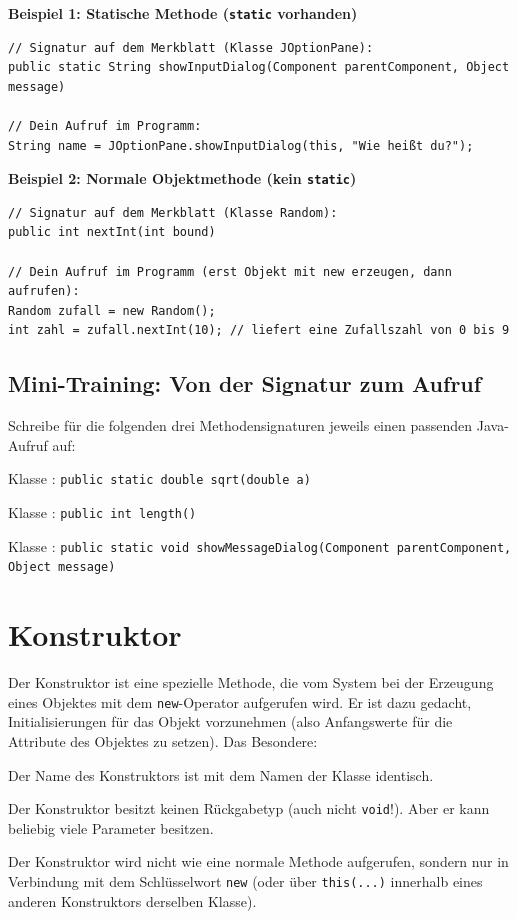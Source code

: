 \medskip
\noindent \textbf{Beispiel 1: Statische Methode (\texttt{static} vorhanden)}

\begin{lstlisting}
// Signatur auf dem Merkblatt (Klasse JOptionPane):
public static String showInputDialog(Component parentComponent, Object message)

// Dein Aufruf im Programm:
String name = JOptionPane.showInputDialog(this, "Wie heißt du?");
\end{lstlisting}

\noindent \textbf{Beispiel 2: Normale Objektmethode (kein \texttt{static})}

\begin{lstlisting}
// Signatur auf dem Merkblatt (Klasse Random):
public int nextInt(int bound)

// Dein Aufruf im Programm (erst Objekt mit new erzeugen, dann aufrufen):
Random zufall = new Random();
int zahl = zufall.nextInt(10); // liefert eine Zufallszahl von 0 bis 9
\end{lstlisting}

\subsection*{Mini-Training: Von der Signatur zum Aufruf}

Schreibe für die folgenden drei Methodensignaturen jeweils einen passenden
Java-Aufruf auf:

\begin{compactenum}[a)]
  \item Klasse : \lstinline|public static double sqrt(double a)|
  \item Klasse : \lstinline|public int length()|
  \item Klasse : \lstinline|public static void showMessageDialog(Component parentComponent, Object message)|
\end{compactenum}


\section{Konstruktor}

Der Konstruktor ist eine spezielle Methode, die vom System bei der Erzeugung
eines Objektes mit dem \lstinline|new|-Operator aufgerufen wird. Er ist dazu
gedacht, Initialisierungen für das Objekt vorzunehmen (also Anfangswerte für
die Attribute des Objektes zu setzen). Das Besondere:

\begin{compactitem}
\item Der Name des Konstruktors ist mit dem Namen der Klasse identisch.
\item Der Konstruktor besitzt keinen Rückgabetyp (auch nicht
\lstinline|void|!). Aber er kann beliebig viele Parameter besitzen.
\item Der Konstruktor wird nicht wie eine normale Methode aufgerufen, sondern nur 
in Verbindung mit dem Schlüsselwort \lstinline|new| (oder über \lstinline|this(...)| 
innerhalb eines anderen Konstruktors derselben Klasse).
\end{compactitem}
